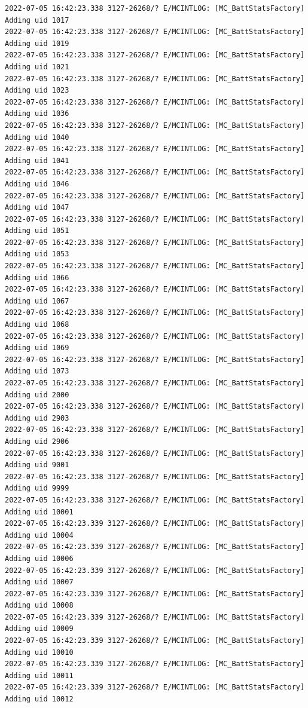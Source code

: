 \documentclass[a4paper,12pt]{book}
\begin{document}
\begin{lstlisting}
2022-07-05 16:42:23.338 3127-26268/? E/MCINTLOG: [MC_BattStatsFactory] Adding uid 1017
2022-07-05 16:42:23.338 3127-26268/? E/MCINTLOG: [MC_BattStatsFactory] Adding uid 1019
2022-07-05 16:42:23.338 3127-26268/? E/MCINTLOG: [MC_BattStatsFactory] Adding uid 1021
2022-07-05 16:42:23.338 3127-26268/? E/MCINTLOG: [MC_BattStatsFactory] Adding uid 1023
2022-07-05 16:42:23.338 3127-26268/? E/MCINTLOG: [MC_BattStatsFactory] Adding uid 1036
2022-07-05 16:42:23.338 3127-26268/? E/MCINTLOG: [MC_BattStatsFactory] Adding uid 1040
2022-07-05 16:42:23.338 3127-26268/? E/MCINTLOG: [MC_BattStatsFactory] Adding uid 1041
2022-07-05 16:42:23.338 3127-26268/? E/MCINTLOG: [MC_BattStatsFactory] Adding uid 1046
2022-07-05 16:42:23.338 3127-26268/? E/MCINTLOG: [MC_BattStatsFactory] Adding uid 1047
2022-07-05 16:42:23.338 3127-26268/? E/MCINTLOG: [MC_BattStatsFactory] Adding uid 1051
2022-07-05 16:42:23.338 3127-26268/? E/MCINTLOG: [MC_BattStatsFactory] Adding uid 1053
2022-07-05 16:42:23.338 3127-26268/? E/MCINTLOG: [MC_BattStatsFactory] Adding uid 1066
2022-07-05 16:42:23.338 3127-26268/? E/MCINTLOG: [MC_BattStatsFactory] Adding uid 1067
2022-07-05 16:42:23.338 3127-26268/? E/MCINTLOG: [MC_BattStatsFactory] Adding uid 1068
2022-07-05 16:42:23.338 3127-26268/? E/MCINTLOG: [MC_BattStatsFactory] Adding uid 1069
2022-07-05 16:42:23.338 3127-26268/? E/MCINTLOG: [MC_BattStatsFactory] Adding uid 1073
2022-07-05 16:42:23.338 3127-26268/? E/MCINTLOG: [MC_BattStatsFactory] Adding uid 2000
2022-07-05 16:42:23.338 3127-26268/? E/MCINTLOG: [MC_BattStatsFactory] Adding uid 2903
2022-07-05 16:42:23.338 3127-26268/? E/MCINTLOG: [MC_BattStatsFactory] Adding uid 2906
2022-07-05 16:42:23.338 3127-26268/? E/MCINTLOG: [MC_BattStatsFactory] Adding uid 9001
2022-07-05 16:42:23.338 3127-26268/? E/MCINTLOG: [MC_BattStatsFactory] Adding uid 9999
2022-07-05 16:42:23.338 3127-26268/? E/MCINTLOG: [MC_BattStatsFactory] Adding uid 10001
2022-07-05 16:42:23.339 3127-26268/? E/MCINTLOG: [MC_BattStatsFactory] Adding uid 10004
2022-07-05 16:42:23.339 3127-26268/? E/MCINTLOG: [MC_BattStatsFactory] Adding uid 10006
2022-07-05 16:42:23.339 3127-26268/? E/MCINTLOG: [MC_BattStatsFactory] Adding uid 10007
2022-07-05 16:42:23.339 3127-26268/? E/MCINTLOG: [MC_BattStatsFactory] Adding uid 10008
2022-07-05 16:42:23.339 3127-26268/? E/MCINTLOG: [MC_BattStatsFactory] Adding uid 10009
2022-07-05 16:42:23.339 3127-26268/? E/MCINTLOG: [MC_BattStatsFactory] Adding uid 10010
2022-07-05 16:42:23.339 3127-26268/? E/MCINTLOG: [MC_BattStatsFactory] Adding uid 10011
2022-07-05 16:42:23.339 3127-26268/? E/MCINTLOG: [MC_BattStatsFactory] Adding uid 10012

\end{lstlisting}
\end{document}
